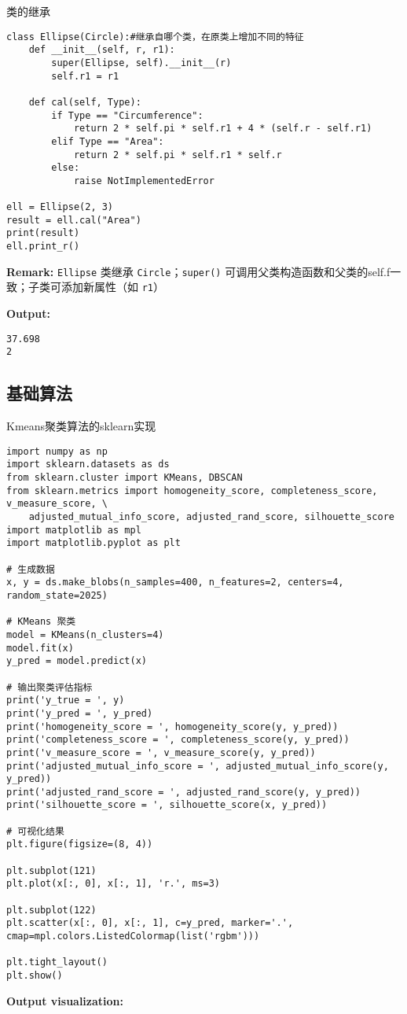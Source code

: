 \documentclass{article}
\begin{document}
类的继承

\begin{lstlisting}
class Ellipse(Circle):#继承自哪个类，在原类上增加不同的特征
    def __init__(self, r, r1):
        super(Ellipse, self).__init__(r)
        self.r1 = r1

    def cal(self, Type):
        if Type == "Circumference":
            return 2 * self.pi * self.r1 + 4 * (self.r - self.r1)
        elif Type == "Area":
            return 2 * self.pi * self.r1 * self.r
        else:
            raise NotImplementedError

ell = Ellipse(2, 3)
result = ell.cal("Area")
print(result)
ell.print_r()
\end{lstlisting}

\textbf{Remark:}  
\texttt{Ellipse} 类继承 \texttt{Circle}；\texttt{super()} 可调用父类构造函数和父类的self.f一致；子类可添加新属性（如 \texttt{r1}）

\textbf{Output:}
\begin{verbatim}
37.698
2
\end{verbatim}

\subsection{基础算法}

Kmeans聚类算法的sklearn实现

\begin{lstlisting}
import numpy as np
import sklearn.datasets as ds
from sklearn.cluster import KMeans, DBSCAN
from sklearn.metrics import homogeneity_score, completeness_score, v_measure_score, \
    adjusted_mutual_info_score, adjusted_rand_score, silhouette_score
import matplotlib as mpl
import matplotlib.pyplot as plt

# 生成数据
x, y = ds.make_blobs(n_samples=400, n_features=2, centers=4, random_state=2025)

# KMeans 聚类
model = KMeans(n_clusters=4)
model.fit(x)
y_pred = model.predict(x)

# 输出聚类评估指标
print('y_true = ', y)
print('y_pred = ', y_pred)
print('homogeneity_score = ', homogeneity_score(y, y_pred))
print('completeness_score = ', completeness_score(y, y_pred))
print('v_measure_score = ', v_measure_score(y, y_pred))
print('adjusted_mutual_info_score = ', adjusted_mutual_info_score(y, y_pred))
print('adjusted_rand_score = ', adjusted_rand_score(y, y_pred))
print('silhouette_score = ', silhouette_score(x, y_pred))

# 可视化结果
plt.figure(figsize=(8, 4))

plt.subplot(121)
plt.plot(x[:, 0], x[:, 1], 'r.', ms=3)

plt.subplot(122)
plt.scatter(x[:, 0], x[:, 1], c=y_pred, marker='.', cmap=mpl.colors.ListedColormap(list('rgbm')))

plt.tight_layout()
plt.show()
\end{lstlisting}
\textbf{Output visualization:}
\end{document}
